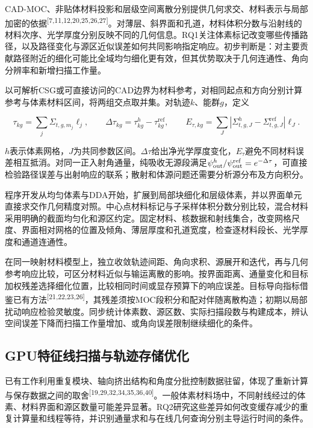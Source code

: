 \documentclass[UTF8, zihao=-4, fontset=none, a4paper]{ctexart}
\newcommand{\upcite}[1]{\textsuperscript{[#1]}}
\begin{document}
CAD-MOC、非贴体材料投影和层级空间离散分别提供几何求交、材料表示与局部加密的依据\upcite{7,11,12,20,25,26,27}。对薄层、斜界面和孔道，材料体积分数与沿射线的材料次序、光学厚度分别反映不同的几何信息。RQ1关注体素标记改变哪些传播路径，以及路径变化与源区近似误差如何共同影响指定响应。初步判断是：对主要贡献路径附近的细化可能比全域均匀细化更有效，但其优势取决于几何连通性、角向分辨率和新增扫描工作量。

以可解析CSG或可直接访问的CAD边界为材料参考，对相同起点和方向分别计算参考与体素材料区间，将两组交点取并集。对轨迹\(k\)、能群\(g\)，定义

\begin{equation}
\tau_{kg}=\sum_j\Sigma_{t,g,m_j}\ell_j,\qquad
\Delta\tau_{kg}=\tau^{h}_{kg}-\tau^{\mathrm{ref}}_{kg},\qquad
E_{\tau,kg}=\sum_{J}\left|\Sigma^{h}_{t,g,J}-\Sigma^{\mathrm{ref}}_{t,g,J}\right|\ell_J.
\label{eq:patherror}
\end{equation}

\(h\)表示体素网格，\(J\)为共同参数区间。\(\Delta\tau\)给出净光学厚度变化，\(E_\tau\)避免不同材料误差相互抵消。对同一正入射角通量，纯吸收无源段满足\(\psi^h_{\rm out}/\psi^{\rm ref}_{\rm out}=e^{-\Delta\tau}\)，可直接检验路径误差与出射响应的联系；散射和体源问题还需要分析源分布及方向积分。

程序开发从均匀体素与DDA开始，扩展到局部块细化和层级体素，并以界面单元直接求交作几何精度对照。中心点材料标记与子采样体积分数分别比较，混合材料采用明确的截面均匀化和源区约定。固定材料、核数据和射线集合，改变网格尺度、界面相对网格的位置及倾角、薄层厚度和孔道宽度，检查逐材料段长、光学厚度和通道连通性。

在同一映射材料模型上，独立收敛轨迹间距、角向求积、源展开和迭代，再与几何参考响应比较，可区分材料近似与输运离散的影响。按界面距离、通量变化和目标加权残差选择细化位置，比较相同时间或显存预算下的响应误差。目标导向指标借鉴已有方法\upcite{21,22,23,26}，其残差须按MOC段积分和配对伴随离散构造；初期以局部扰动响应检验灵敏度。同步统计体素数、源区数、实际扫描段数与构建成本，辨认空间误差下降而扫描工作量增加、或角向误差限制继续细化的条件。

\subsection{GPU特征线扫描与轨迹存储优化}

已有工作利用重复模块、轴向挤出结构和角度分批控制数据驻留，体现了重新计算与保存数据之间的取舍\upcite{19,29,32,34,35,36,40}。一般体素材料场中，不同射线经过的体素、材料界面和源区数量可能差异显著。RQ2研究这些差异如何改变缓存减少的重复计算量和线程等待，并识别通量求和与在线几何查询分别主导运行时间的条件。
\end{document}
